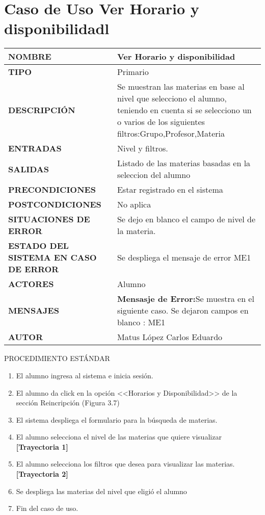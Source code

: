 \newpage
\section{Caso de Uso Ver Horario y disponibilidadl}
\begin{longtable}{ | p{6cm} | p{10cm} |}
\hline
\textbf{NOMBRE} & Ver Horario y disponibilidad\\
\hline
\textbf{TIPO} & Primario\\
\hline
\textbf{DESCRIPCIÓN} & Se muestran las materias en base al nivel que selecciono el alumno, teniendo en cuenta si se selecciono un o varios de los siguientes filtros:Grupo,Profesor,Materia\\
\hline
\textbf{ENTRADAS} & Nivel y filtros.\\
\hline
\textbf{SALIDAS} & Listado de las materias basadas en la seleccion del alumno\\
\hline
\textbf{PRECONDICIONES} & Estar registrado en el sistema\\
\hline
\textbf{POSTCONDICIONES} & No aplica\\
\hline
\textbf{SITUACIONES DE ERROR} & Se dejo en blanco el campo de nivel de la materia.\\
\hline
\textbf{ESTADO DEL SISTEMA EN CASO DE ERROR} & Se despliega el mensaje de error ME1\\
\hline
\textbf{ACTORES} & Alumno\\
\hline
\textbf{MENSAJES} & \textbf{Mensasje de Error:}Se muestra en el siguiente caso. Se dejaron campos en blanco : ME1\\
\hline
\textbf{AUTOR} & Matus López Carlos Eduardo\\
\hline
\end{longtable}
\vspace*{1cm}
\noindent
\Large{PROCEDIMIENTO ESTÁNDAR}
\large{}
\begin{enumerate}
    \item El alumno ingresa al sistema e inicia sesión.
    \item El alumno da click en la opción <<Horarios y Disponibilidad>> de la sección Reincripción (Figura 3.7)
    \item El sistema despliega el formulario para la búsqueda de materias.
    \item El alumno selecciona el nivel de las materias que quiere visualizar \textbf{[Trayectoria 1]}
    \item El alumno selecciona los filtros que desea para visualizar las materias. \textbf{[Trayectoria 2]}
    \item Se despliega las materias del nivel que eligió el alumno
    \item Fin del caso de uso.
\end{enumerate}
